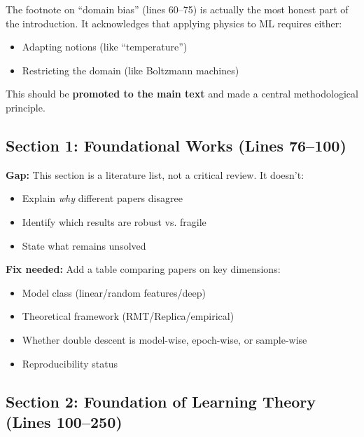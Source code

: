 \documentclass[11pt]{article}
\begin{document}
\begin{insightbox}
The footnote on ``domain bias'' (lines 60--75) is actually the most honest part of the introduction. It acknowledges that applying physics to ML requires either:
\begin{itemize}
    \item Adapting notions (like ``temperature'')
    \item Restricting the domain (like Boltzmann machines)
\end{itemize}
This should be \textbf{promoted to the main text} and made a central methodological principle.
\end{insightbox}

\subsection{Section 1: Foundational Works (Lines 76--100)}

\begin{missingbox}
\textbf{Gap:} This section is a literature list, not a critical review. It doesn't:
\begin{itemize}
    \item Explain \emph{why} different papers disagree
    \item Identify which results are robust vs. fragile
    \item State what remains unsolved
\end{itemize}

\textbf{Fix needed:} Add a table comparing papers on key dimensions:
\begin{itemize}
    \item Model class (linear/random features/deep)
    \item Theoretical framework (RMT/Replica/empirical)
    \item Whether double descent is model-wise, epoch-wise, or sample-wise
    \item Reproducibility status
\end{itemize}
\end{missingbox}

\subsection{Section 2: Foundation of Learning Theory (Lines 100--250)}
\end{document}
